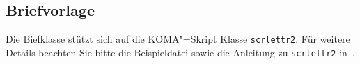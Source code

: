 \subsection{Briefvorlage}

Die Biefklasse stützt sich auf die KOMA"=Skript Klasse \verb|scrlettr2|.
Für weitere Details beachten Sie bitte die Beispieldatei sowie die Anleitung zu \verb|scrlettr2| in~\cite{KOMA}.
